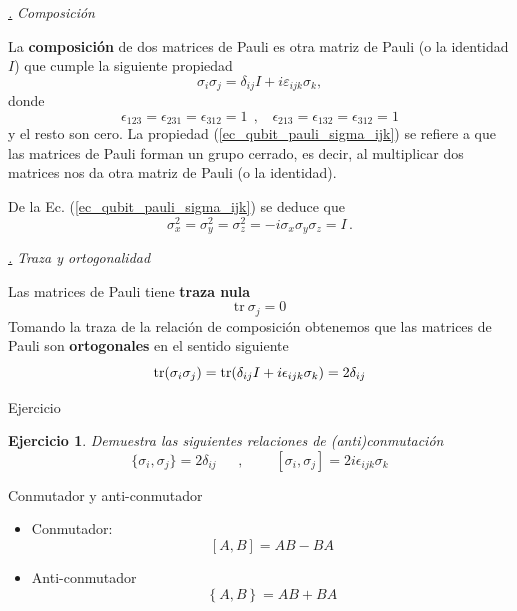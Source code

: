 \documentclass[a4paper,11pt]{book} %
\newtheorem{ejercicio_contador}{Ejercicio}
\newcommand{\Ejercicio}[1]{
		\begin{mybox_gray}{Ejercicio} 
			\begin{ejercicio_contador}
				 #1 
			\end{ejercicio_contador} 
		\end{mybox_gray}
	}
\numberwithin{equation}{chapter}
\def\lc{\left[}
\def\rc{\right]}
\def\lch{\left\{}
\def\rch{\right\}}
\def\subsubiContadorIt{\par\addtocounter{subsubsection}{1}\underline{\it\thesubsubsection.}\hskip0.5cm \setcounter{subsubsubsectionIt}{0}}
\newcommand{\SubsubiIt}[1]{
		\subsubiContadorIt \textit{#1}
	}
\newcounter{subsubsubsectionIt}[subsubsection]
\begin{document}
			\SubsubiIt{Composición}

La \textbf{composición} de dos matrices de Pauli es otra matriz de Pauli (o la identidad $I$) que cumple la siguiente propiedad
	\begin{equation}
	\sigma_i \sigma_j = \delta_{ij} I + i \varepsilon_{ijk} \sigma_k,  \label{ec_qubit_pauli_sigma_ijk}
	\end{equation}
donde 
	\begin{equation}
	\epsilon_{123}=\epsilon_{231}=\epsilon_{312} = 1 ~~, ~~~~ \epsilon_{213}=\epsilon_{132}=\epsilon_{312} = 1
	\end{equation}
y el resto son cero. La propiedad (\ref{ec_qubit_pauli_sigma_ijk}) se refiere a que las matrices de Pauli forman un grupo cerrado, es decir, al multiplicar dos matrices nos da otra matriz de Pauli (o la identidad). 

De la Ec. (\ref{ec_qubit_pauli_sigma_ijk}) se deduce que
	\begin{equation}
	\sigma_x^2 = \sigma_y^2 = \sigma_z^2 = - i \sigma_x \sigma_y \sigma_z = I \,.   \label{ec_qubit_pauli_sigma^2}
	\end{equation}

			\SubsubiIt{Traza y ortogonalidad}

Las matrices de Pauli tiene \textbf{traza nula}
	\begin{equation}
	\text{tr} ~ \sigma_j = 0 \label{ec_qubit_sigma_tr} 
	\end{equation}
Tomando la traza de la relación de composición obtenemos que las matrices de Pauli son \textbf{ortogonales} en el sentido siguiente
	\begin{equation}
	{\rm tr}(\sigma_i\sigma_j) = {\rm tr}(\delta_{ij}I + i\epsilon_{ijk}  \sigma_k) = 2\delta_{ij}
	\end{equation}
	

	\Ejercicio{Demuestra las siguientes relaciones de (anti)conmutación
    $$
	\{\sigma_i,\sigma_j \} = 2\delta_{ij}~~~~~~~,~~~~~~~
	~~~[\sigma_i,\sigma_j] = 2i\epsilon_{ijk}\sigma_k
	$$}

\begin{mybox_blue}{Conmutador y anti-conmutador}
\begin{itemize}
	\item Conmutador:
		\begin{equation}
		\lc A, B \rc = AB - BA
		\end{equation}
	\item Anti-conmutador
		\begin{equation}
		\lch A,B \rch = AB + BA
		\end{equation}
\end{itemize} 
\end{mybox_blue}
\end{document}
